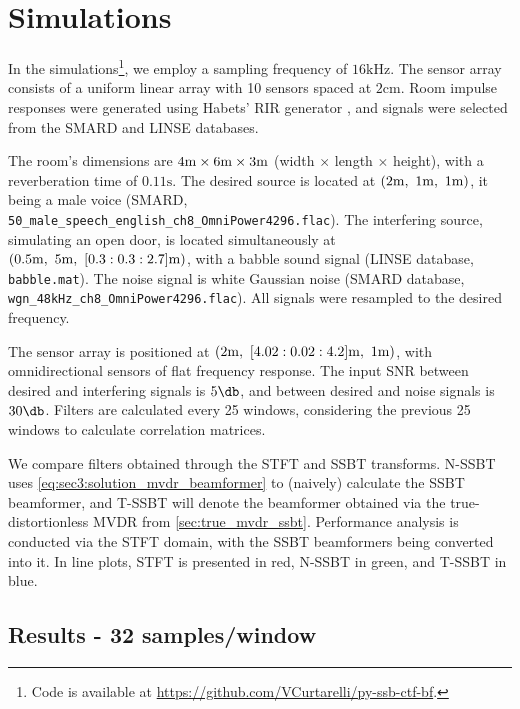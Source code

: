 
\section{Simulations}
\label{sec:results}

In the simulations\footnote{Code is available at \url{https://github.com/VCurtarelli/py-ssb-ctf-bf}.}, we employ a sampling frequency of $16\si{\kilo\hertz}$. The sensor array consists of a uniform linear array with 10 sensors spaced at $2\si{\cm}$. Room impulse responses were generated using Habets' RIR generator \cite{habets_rir-generator}, and signals were selected from the SMARD \cite{smard_database} and LINSE \cite{linse_database} databases.

The room's dimensions are $4\si{\meter} \times 6\si{\meter} \times 3\si{\meter}$ (width $\times$ length $\times$ height), with a reverberation time of $0.11\si{\second}$. The desired source is located at $(2\si{\meter},~1\si{\meter},~1\si{\meter})$, it being a male voice (SMARD, \texttt{50\_male\_speech\_english\_ch8\_OmniPower4296.flac}).
%
The interfering source, simulating an open door, is located simultaneously at $(0.5\si{\meter},~5\si{\meter},~[0.3:0.3:2.7]\si{\meter})$, with a babble sound signal (LINSE database, \texttt{babble.mat}). The noise signal is white Gaussian noise (SMARD database, \texttt{wgn\_48kHz\_ch8\_OmniPower4296.flac}). All signals were resampled to the desired frequency.

The sensor array is positioned at $(2\si{\meter},~[4.02:0.02:4.2]\si{\meter},~1\si{\meter})$, with omnidirectional sensors of flat frequency response. The input SNR between desired and interfering signals is $5\dB$, and between desired and noise signals is $30\dB$. Filters are calculated every 25 windows, considering the previous 25 windows to calculate correlation matrices.

We compare filters obtained through the STFT and SSBT transforms. N-SSBT uses \cref{eq:sec3:solution_mvdr_beamformer} to (naively) calculate the SSBT beamformer, and T-SSBT will denote the beamformer obtained via the true-distortionless MVDR from \cref{sec:true_mvdr_ssbt}. Performance analysis is conducted via the STFT domain, with the SSBT beamformers being converted into it. In line plots, STFT is presented in red, N-SSBT in green, and T-SSBT in blue.


\subsection{Results - 32 samples/window}

